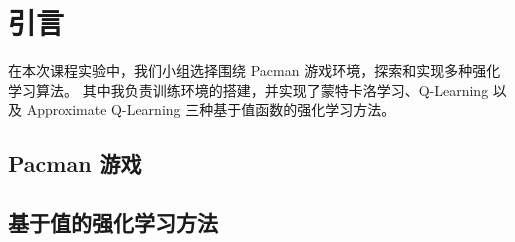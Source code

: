 \section{引言}

在本次课程实验中，我们小组选择围绕 Pacman 游戏环境，探索和实现多种强化学习算法。
其中我负责训练环境的搭建，并实现了蒙特卡洛学习、Q-Learning 以及 Approximate Q-Learning 三种基于值函数的强化学习方法。

\subsection{Pacman 游戏}


\subsection{基于值的强化学习方法}

